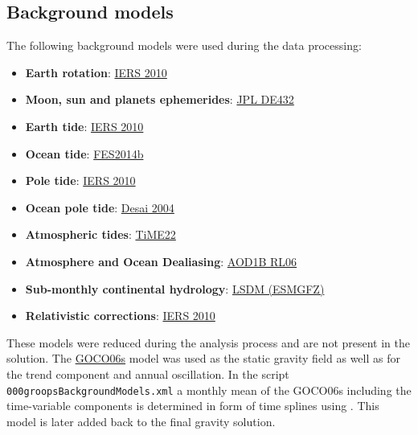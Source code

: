 \subsection{Background models}\label{cookbook.gravityFieldGrace:backgroundModels}
The following background models were used during the data processing:
\begin{itemize}
  \item \textbf{Earth rotation}: \href{https://www.iers.org/IERS/EN/Publications/TechnicalNotes/tn36.html}{IERS 2010} %
  \item \textbf{Moon, sun and planets ephemerides}: \href{https://ipnpr.jpl.nasa.gov/progress_report/42-196/196C.pdf}{JPL DE432} %
  \item \textbf{Earth tide}: \href{https://www.iers.org/IERS/EN/Publications/TechnicalNotes/tn36.html}{IERS 2010} %
  \item \textbf{Ocean tide}: \href{https://www.aviso.altimetry.fr/en/data/products/auxiliary-products/global-tide-fes/description-fes2014.html}{FES2014b} %
  \item \textbf{Pole tide}: \href{https://www.iers.org/IERS/EN/Publications/TechnicalNotes/tn36.html}{IERS 2010} %
  \item \textbf{Ocean pole tide}: \href{https://doi.org/10.1029/2001JC001224}{Desai 2004} %
  \item \textbf{Atmospheric tides}: \href{https://doi.org/10.1029/2022MS003193}{TiME22} %
  \item \textbf{Atmosphere and Ocean Dealiasing}: \href{https://doi.org/10.1093/gji/ggx302}{AOD1B RL06} %
  \item \textbf{Sub-monthly continental hydrology}: \href{https://doi.org/10.2312/GFZ.b103-08095}{LSDM (ESMGFZ)} %
  \item \textbf{Relativistic corrections}: \href{https://www.iers.org/IERS/EN/Publications/TechnicalNotes/tn36.html}{IERS 2010} %
\end{itemize}
These models were reduced during the analysis process and are not present in the solution.
The \href{https://doi.org/10.5194/essd-13-99-2021}{GOCO06s}
model was used as the static gravity field as well as for the trend component and annual oscillation.
In the script \verb|000groopsBackgroundModels.xml| a monthly mean of the GOCO06s including the time-variable components is determined
in form of time splines using . This model is later added back to the final gravity solution.


